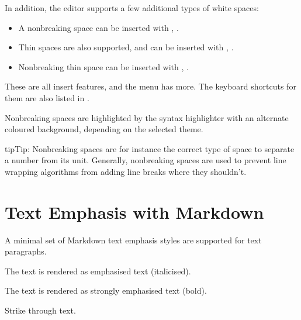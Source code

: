 \documentclass[a4paper,11pt,english]{sphinxmanual}
\begin{document}
\sphinxAtStartPar
In addition, the editor supports a few additional types of white spaces:
\begin{itemize}
\item {} 
\sphinxAtStartPar
A non\sphinxhyphen{}breaking space can be inserted with , .

\item {} 
\sphinxAtStartPar
Thin spaces are also supported, and can be inserted with , .

\item {} 
\sphinxAtStartPar
Non\sphinxhyphen{}breaking thin space can be inserted with , .

\end{itemize}

\sphinxAtStartPar
These are all insert features, and the  menu has more. The keyboard shortcuts for them
are also listed in {\hyperref[\detokenize{usage_shortcuts:a-kb-ins}]{}}.

\sphinxAtStartPar
Non\sphinxhyphen{}breaking spaces are highlighted by the syntax highlighter with an alternate coloured
background, depending on the selected theme.

\begin{sphinxadmonition}{tip}{Tip:}
\sphinxAtStartPar
Non\sphinxhyphen{}breaking spaces are for instance the correct type of space to separate a number from its
unit. Generally, non\sphinxhyphen{}breaking spaces are used to prevent line wrapping algorithms from adding
line breaks where they shouldn’t.
\end{sphinxadmonition}


\section{Text Emphasis with Markdown}
\label{\detokenize{usage_format:text-emphasis-with-markdown}}\label{\detokenize{usage_format:a-fmt-emph}}
\sphinxAtStartPar
A minimal set of Markdown text emphasis styles are supported for text paragraphs.
\begin{description}
\sphinxAtStartPar
The text is rendered as emphasised text (italicised).

\sphinxAtStartPar
The text is rendered as strongly emphasised text (bold).

\sphinxAtStartPar
Strike through text.

\end{description}
\end{document}
